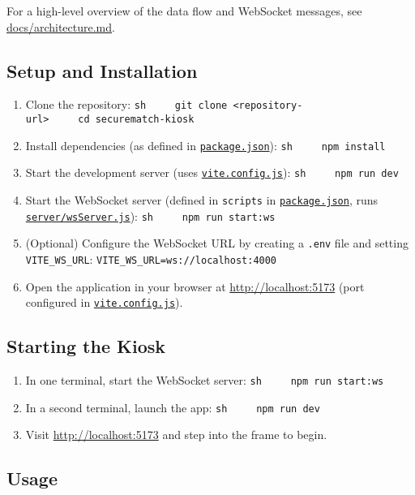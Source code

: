 For a high-level overview of the data flow and WebSocket messages, see
\url{docs/architecture.md}.

\subsection{Setup and Installation}\label{setup-and-installation}

\begin{enumerate}
\def\labelenumi{\arabic{enumi}.}
\item
  Clone the repository:
  \texttt{sh\ \ \ \ \ git\ clone\ \textless{}repository-url\textgreater{}\ \ \ \ \ cd\ securematch-kiosk}
\item
  Install dependencies (as defined in
  \href{package.json}{\texttt{package.json}}):
  \texttt{sh\ \ \ \ \ npm\ install}
\item
  Start the development server (uses
  \href{vite.config.js}{\texttt{vite.config.js}}):
  \texttt{sh\ \ \ \ \ npm\ run\ dev}
\item
  Start the WebSocket server (defined in \texttt{scripts} in
  \href{package.json}{\texttt{package.json}}, runs
  \href{server/wsServer.js}{\texttt{server/wsServer.js}}):
  \texttt{sh\ \ \ \ \ npm\ run\ start:ws}
\item
  (Optional) Configure the WebSocket URL by creating a \texttt{.env}
  file and setting \texttt{VITE\_WS\_URL}:
  \texttt{VITE\_WS\_URL=ws://localhost:4000}
\item
  Open the application in your browser at \url{http://localhost:5173}
  (port configured in \href{vite.config.js}{\texttt{vite.config.js}}).
\end{enumerate}

\subsection{Starting the Kiosk}\label{starting-the-kiosk}

\begin{enumerate}
\def\labelenumi{\arabic{enumi}.}
\tightlist
\item
  In one terminal, start the WebSocket server:
  \texttt{sh\ \ \ \ \ npm\ run\ start:ws}
\item
  In a second terminal, launch the app:
  \texttt{sh\ \ \ \ \ npm\ run\ dev}
\item
  Visit \url{http://localhost:5173} and step into the frame to begin.
\end{enumerate}

\subsection{Usage}\label{usage}

